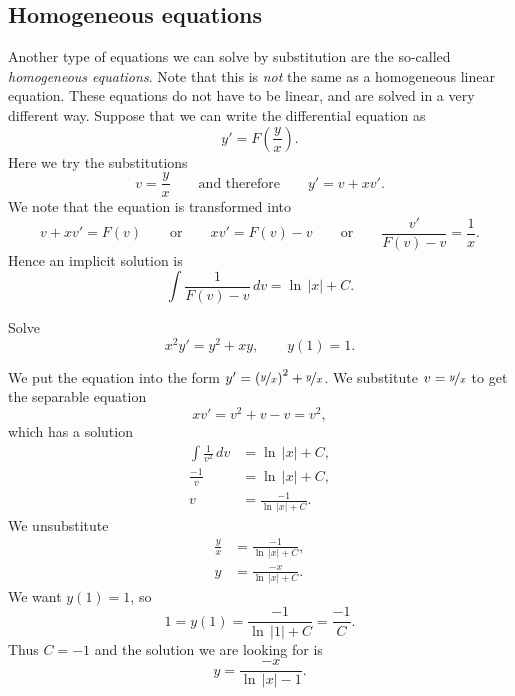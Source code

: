 \documentclass{ximera}
\begin{document}
\subsection{Homogeneous equations}

Another type of equations we can solve by substitution are the so-called \emph{homogeneous equations}. Note that this is \emph{not} the same as a homogeneous linear equation. These equations do not have to be linear, and are solved in a very different way. Suppose that we can write the differential equation as
\begin{equation*}
    y' = F\left(\frac{y}{x}\right) .
\end{equation*}
Here we try the substitutions
\begin{equation*}
    v = \frac{y}{x} \qquad \text{and therefore} \qquad y' = v + x v' .
\end{equation*}
We note that the equation is transformed into
\begin{equation*}
    v+ xv' = F(v) \qquad \text{or} \qquad xv' = F(v)-v \qquad \text{or} \qquad \frac{v'}{F(v)-v} = \frac{1}{x} .
\end{equation*}
Hence an implicit solution is
\begin{equation*}
    \int \frac{1}{F(v)-v} \,dv = \ln \, \lvert x \rvert + C .
\end{equation*}

\begin{example}
    Solve 
    \begin{equation*}
        x^2y' = y^2+xy, \qquad y(1)=1.
    \end{equation*}
\end{example}

\begin{exampleSol}
    We put the equation into the form $y'= {\left(\nicefrac{y}{x}\right)}^2+\nicefrac{y}{x}$.  We substitute $v=\nicefrac{y}{x}$ to get the separable equation
    \begin{equation*}
        xv' = v^2+v-v = v^2 ,
    \end{equation*}
    which has a solution
    \begin{align*}
        \int \frac{1}{v^2} \,dv &= \ln \, \lvert x \rvert + C , \\
        \frac{-1}{v} &= \ln \, \lvert x \rvert + C , \\
        v &= \frac{-1}{\ln \, \lvert x \rvert + C} .
    \end{align*}
    We unsubstitute
    \begin{align*}
        \frac{y}{x} &= \frac{-1}{\ln \, \lvert x \rvert + C} , \\
        y &= \frac{-x}{\ln \, \lvert x \rvert + C} .
    \end{align*}
    We want $y(1)=1$, so 
    \begin{equation*}
        1 = y(1) = \frac{-1}{\ln \, \lvert 1 \rvert + C} = \frac{-1}{C} .
    \end{equation*}
    Thus $C = -1$ and the solution we are looking for is
    \begin{equation*}
        y = \frac{-x}{\ln \, \lvert x \rvert -1} .
    \end{equation*}
\end{exampleSol}
\end{document}
